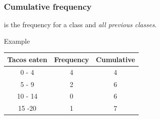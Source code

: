 \documentclass[xcolor=table, aspectratio=169, bigger]{beamer}
\begin{document}
\begin{frame}
\frametitle{Cumulative frequency}

\begin{block}{}
 is the frequency for a class and \emph{all previous classes}.
\end{block}
\pause
\begin{exampleblock}{Example}

\begin{center}
\begin{tabular}{c | c | c }
Tacos eaten & Frequency & Cumulative\\
\hline
0 - 4 & 4 & 4\\
5 - 9 & 2 & 6\\
10 - 14 & 0 & 6\\
15 -20 & 1 & 7\\
\end{tabular}
\end{center}
\end{exampleblock}
\end{frame}
\end{document}
